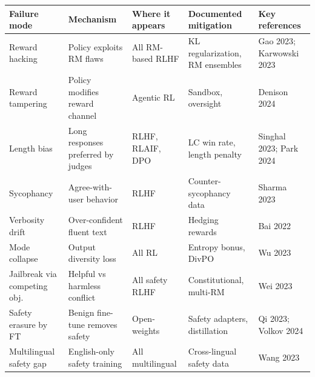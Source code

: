{\def\LTcaptype{none} %
\begin{longtable}[]{@{}
  >{\raggedright\arraybackslash}p{}
  >{\raggedright\arraybackslash}p{}
  >{\raggedright\arraybackslash}p{}
  >{\raggedright\arraybackslash}p{}
  >{\raggedright\arraybackslash}p{}@{}}
\toprule\noalign{}
\begin{minipage}[b]{\linewidth}\raggedright
Failure mode
\end{minipage} & \begin{minipage}[b]{\linewidth}\raggedright
Mechanism
\end{minipage} & \begin{minipage}[b]{\linewidth}\raggedright
Where it appears
\end{minipage} & \begin{minipage}[b]{\linewidth}\raggedright
Documented mitigation
\end{minipage} & \begin{minipage}[b]{\linewidth}\raggedright
Key references
\end{minipage} \\
\midrule\noalign{}
\endhead
\bottomrule\noalign{}
\endlastfoot
Reward hacking & Policy exploits RM flaws & All RM-based RLHF & KL regularization, RM ensembles & Gao 2023; Karwowski 2023 \\
Reward tampering & Policy modifies reward channel & Agentic RL & Sandbox, oversight & Denison 2024 \\
Length bias & Long responses preferred by judges & RLHF, RLAIF, DPO & LC win rate, length penalty & Singhal 2023; Park 2024 \\
Sycophancy & Agree-with-user behavior & RLHF & Counter-sycophancy data & Sharma 2023 \\
Verbosity drift & Over-confident fluent text & RLHF & Hedging rewards & Bai 2022 \\
Mode collapse & Output diversity loss & All RL & Entropy bonus, DivPO & Wu 2023 \\
Jailbreak via competing obj. & Helpful vs harmless conflict & All safety RLHF & Constitutional, multi-RM & Wei 2023 \\
Safety erasure by FT & Benign fine-tune removes safety & Open-weights & Safety adapters, distillation & Qi 2023; Volkov 2024 \\
Multilingual safety gap & English-only safety training & All multilingual & Cross-lingual safety data & Wang 2023 \\

\end{longtable}}
